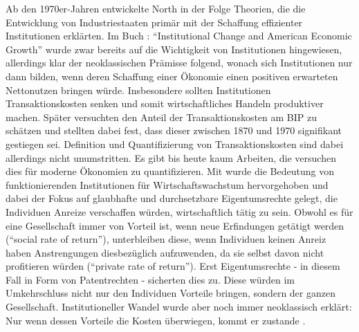 Ab den 1970er-Jahren entwickelte North in der Folge Theorien, die die Entwicklung von Industriestaaten primär mit der Schaffung effizienter Institutionen erklärten. Im Buch \textcite{North1971}: "`Institutional Change and American Economic Growth"' wurde zwar bereits auf die Wichtigkeit von Institutionen hingewiesen, allerdings klar der neoklassischen Prämisse folgend, wonach sich Institutionen nur dann bilden, wenn deren Schaffung einer Ökonomie einen positiven erwarteten Nettonutzen bringen würde. Insbesondere sollten Institutionen Transaktionskosten senken und somit wirtschaftliches Handeln produktiver machen. Später versuchten \textcite{Wallis1986} den Anteil der Transaktionskosten am BIP zu schätzen und stellten dabei fest, dass dieser zwischen 1870 und 1970 signifikant gestiegen sei. Definition und Quantifizierung von Transaktionskosten sind dabei allerdings nicht unumstritten. Es gibt bis heute kaum Arbeiten, die versuchen dies für moderne Ökonomien zu quantifizieren. Mit \textcite{North1973} wurde die Bedeutung von funktionierenden Institutionen für Wirtschaftswachstum hervorgehoben und dabei der Fokus auf glaubhafte und durchsetzbare Eigentumsrechte gelegt, die Individuen Anreize verschaffen würden, wirtschaftlich tätig zu sein. Obwohl es für eine Gesellschaft immer von Vorteil ist, wenn neue Erfindungen getätigt werden ("`social rate of return"'), unterbleiben diese, wenn Individuen keinen Anreiz haben Anstrengungen diesbezüglich aufzuwenden, da sie selbst davon nicht profitieren würden ("`private rate of return"'). Erst Eigentumsrechte - in diesem Fall in Form von Patentrechten - sicherten dies zu. Diese würden im Umkehrschluss nicht nur den Individuen Vorteile bringen, sondern der ganzen Gesellschaft. Institutioneller Wandel wurde aber noch immer neoklassisch erklärt: Nur wenn dessen Vorteile die Kosten überwiegen, kommt er zustande \parencite[S. 13]{Menard2014}. 

